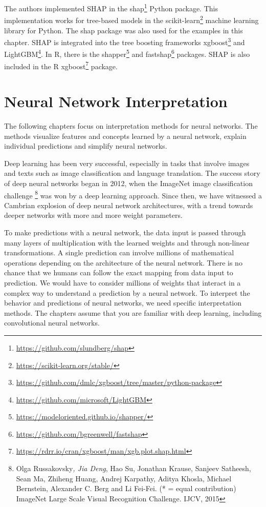 \documentclass[
  12pt,
]{krantz}
\renewcommand{\href}[2]{#2\footnote{\url{#1}}}
\begin{document}
The authors implemented SHAP in the \href{https://github.com/slundberg/shap}{shap} Python package.
This implementation works for tree-based models in the \href{https://scikit-learn.org/stable/}{scikit-learn} machine learning library for Python.
The shap package was also used for the examples in this chapter.
SHAP is integrated into the tree boosting frameworks \href{https://github.com/dmlc/xgboost/tree/master/python-package}{xgboost} and \href{https://github.com/microsoft/LightGBM}{LightGBM}.
In R, there is the \href{https://modeloriented.github.io/shapper/}{shapper} and \href{https://github.com/bgreenwell/fastshap}{fastshap} packages.
SHAP is also included in the R \href{https://rdrr.io/cran/xgboost/man/xgb.plot.shap.html}{xgboost} package.

\hypertarget{neural-networks}{%
\chapter{Neural Network Interpretation}\label{neural-networks}}

The following chapters focus on interpretation methods for neural networks.
The methods visualize features and concepts learned by a neural network, explain individual predictions and simplify neural networks.

Deep learning has been very successful, especially in tasks that involve images and texts such as image classification and language translation.
The success story of deep neural networks began in 2012, when the ImageNet image classification challenge \footnote{Olga Russakovsky\emph{, Jia Deng}, Hao Su, Jonathan Krause, Sanjeev Satheesh, Sean Ma, Zhiheng Huang, Andrej Karpathy, Aditya Khosla, Michael Bernstein, Alexander C. Berg and Li Fei-Fei. (* = equal contribution) ImageNet Large Scale Visual Recognition Challenge. IJCV, 2015} was won by a deep learning approach.
Since then, we have witnessed a Cambrian explosion of deep neural network architectures, with a trend towards deeper networks with more and more weight parameters.

To make predictions with a neural network, the data input is passed through many layers of multiplication with the learned weights and through non-linear transformations.
A single prediction can involve millions of mathematical operations depending on the architecture of the neural network.
There is no chance that we humans can follow the exact mapping from data input to prediction.
We would have to consider millions of weights that interact in a complex way to understand a prediction by a neural network.
To interpret the behavior and predictions of neural networks, we need specific interpretation methods.
The chapters assume that you are familiar with deep learning, including convolutional neural networks.
\end{document}
